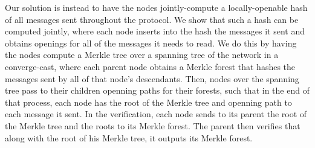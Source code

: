Our solution is instead to have the nodes jointly-compute a locally-openable hash of all messages sent throughout the protocol. We show that such a hash can be computed jointly, where each node inserts into the hash the messages it sent and obtains openings for all of the messages it needs to read.
We do this by having the nodes compute a Merkle tree over a spanning tree of the network in a converge-cast, where each parent node obtains a Merkle forest that hashes the messages sent by all of that node's descendants. Then, nodes over the spanning tree pass to their children openning paths for their forests, such that in the end of that process, each node has the root of the Merkle tree and openning path to each message it sent.
In the verification, each node sends to its parent the root of the Merkle tree and the roots to its Merkle forest. The parent then verifies that along with the root of his Merkle tree, it outputs its Merkle forest.